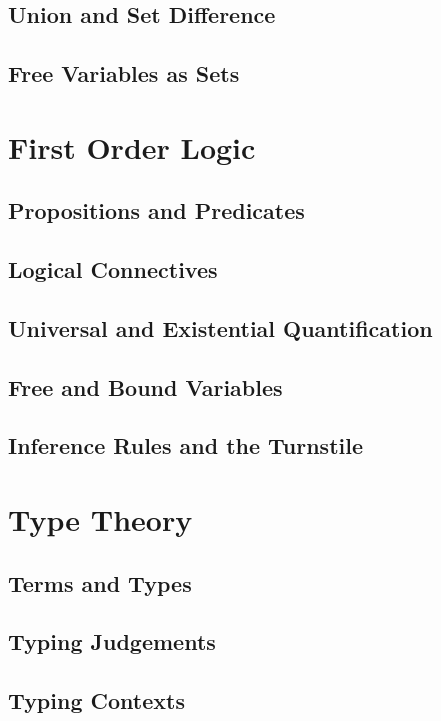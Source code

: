 \documentclass[a4paper,11pt]{article}
\begin{document}
\subsection{Union and Set Difference}

\subsection{Free Variables as Sets}

\section{First Order Logic}
\subsection{Propositions and Predicates}

\subsection{Logical Connectives}

\subsection{Universal and Existential Quantification}

\subsection{Free and Bound Variables}

\subsection{Inference Rules and the Turnstile}

\section{Type Theory}
\subsection{Terms and Types}

\subsection{Typing Judgements}

\subsection{Typing Contexts}
\end{document}
